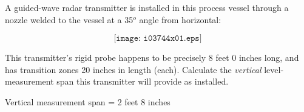 

A guided-wave radar transmitter is installed in this process vessel through a nozzle welded to the vessel at a 35$^{o}$ angle from horizontal:

$$\texttt{[image: i03744x01.eps]}$$

This transmitter's rigid probe happens to be precisely 8 feet 0 inches long, and has transition zones 20 inches in length (each).  Calculate the {\it vertical} level-measurement span this transmitter will provide as installed.







Vertical measurement span = 2 feet 8 inches










